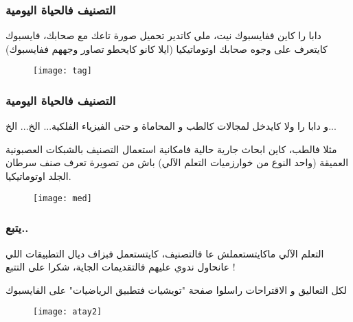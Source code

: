 \documentclass[16pt]{beamer}
\begin{document}
\begin{frame}
\frametitle{\textarabic{ التصنيف فالحياة اليومية}}
\begin{minipage}{0.95\textwidth} 
\begin{Arabic}
دابا را كاين ففايسبوك نيت، ملي كاتدير تحميل صورة تاعك مع صحابك، فايسبوك كايتعرف على وجوه صحابك اوتوماتيكيا (ايلا كانو كايحطو تصاور وجههم ففايسبوك)
 \end{Arabic}
\begin{figure}
\texttt{[image: tag]}
\end{figure}
\end{minipage}
\end{frame}

\begin{frame}
\frametitle{\textarabic{ التصنيف فالحياة اليومية}}
\begin{minipage}{0.95\textwidth} 
\begin{Arabic}
و دابا را ولا كايدخل لمجالات كالطب و المحاماة و حتى الفيزياء الفلكية... الخ... الخ... 

مثلا فالطب، كاين ابحاث جارية حالية فامكانية استعمال التصنيف بالشبكات العصبونية العميقة (واحد النوع من خوارزميات التعلم الآلي) باش من تصويرة تعرف صنف  سرطان الجلد اوتوماتيكيا.
 \end{Arabic}
\begin{figure}
\texttt{[image: med]}
\end{figure}
\end{minipage}
\end{frame}

\begin{frame}
\frametitle{\textarabic{يتبع..}}
\begin{minipage}{0.95\textwidth} 
\begin{Arabic}
التعلم الآلي ماكايتستعملش عا فالتصنيف، كايتستعمل فبزاف ديال التطبيقات اللي عانحاول ندوي عليهم فالتقديمات الجاية، شكرا على التتبع !

لكل التعاليق و الاقتراحات راسلوا صفحة "تويشيات فتطبيق الرياضيات" على الفايسبوك
\end{Arabic}
\begin{figure}
\texttt{[image: atay2]}
\end{figure}
\end{minipage}
\end{frame}
\end{document}
